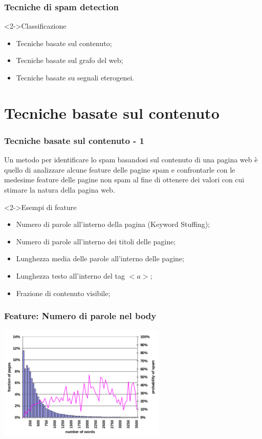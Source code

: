 \documentclass{beamer}
\begin{document}
\begin{frame}
    \frametitle{Tecniche di spam detection}
    \begin{block}<2->{Classificazione}
    \begin{itemize}
    \item<3->Tecniche basate sul contenuto;	
    \item<4->Tecniche basate sul grafo del web;
    \item<5->Tecniche basate su segnali eterogenei.
    \end{itemize}
    \end{block}
\end{frame}
\section{Tecniche basate sul contenuto}
\begin{frame}
    \frametitle{Tecniche basate sul contenuto - 1}
    Un metodo per identificare lo spam basandosi sul contenuto di una pagina web è  quello di analizzare alcune feature delle pagine spam e confrontarle con le medesime feature delle pagine non spam al fine di ottenere dei valori con cui stimare la natura della pagina web.
    \begin{block}<2->{Esempi di feature}
    \begin{itemize}
    \item Numero di parole all'interno della pagina (Keyword Stuffing);
    \item Numero di parole all'interno dei titoli delle pagine;
    \item Lunghezza media delle parole all'interno delle pagine;
    \item Lunghezza testo all'interno del tag \(<a>\);
    \item Frazione di contenuto visibile;
    \end{itemize}
    \end{block}
\end{frame}
\begin{frame}
    \frametitle{Feature: Numero di parole nel body}
  \begin{center}
  \includegraphics[width=8cm]{immagini/contenuto/fetterly3}
  \end{center}
\end{frame}
\end{document}
